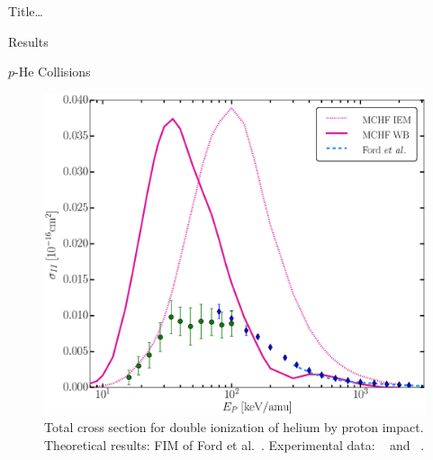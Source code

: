 \documentclass[letterpaper, 11 pt]{report}
\begin{document}
\begin{chapter}{ Title\dots \label{chap:p-he2p-he}}
\begin{section}{Results \label{sec:phe2p-res}}
\begin{subsection}{\texorpdfstring{$p$}{p}-He Collisions \label{sec:phe-res}}
\begin{figure}[ht]
\begin{minipage}{.49\linewidth}
               \centering
               \includegraphics[width = \linewidth]{./images/phe/phe-II.eps}
               \caption[Total cross section for double ionization of helium by proton impact.]
                       {Total cross section for double ionization of helium by proton impact.
                        Theoretical results: FIM of Ford et al.~\cite{FR-94}.
                        Experimental data: {\color{OliveGreen}{$\bullet$}}~\cite{SG89} and
                        {\color{blue}{$\blacklozenge$}}~\cite{SG85}. \label{fig:phe-ii}}

            \end{minipage} \hspace{0.04\linewidth} %
            \begin{minipage}{.49\linewidth}


\end{minipage}
\end{figure}
\end{subsection}
\end{section}
\end{chapter}
\end{document}
